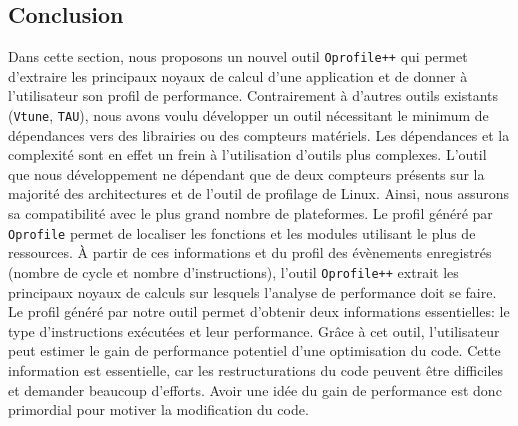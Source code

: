 






\subsection{Conclusion}

    Dans cette section, nous proposons un nouvel outil \verb|Oprofile++| qui permet d'extraire les principaux noyaux de calcul d'une application et de donner à l'utilisateur son profil de performance. Contrairement à d'autres outils existants (\verb=Vtune=, \verb=TAU=), nous avons voulu développer un outil nécessitant le minimum de dépendances vers des librairies ou des compteurs matériels. Les dépendances et la complexité sont en effet un frein à l'utilisation d'outils plus complexes. L'outil que nous développement ne dépendant que de deux compteurs présents sur la majorité des architectures et de l'outil de profilage de Linux. Ainsi, nous assurons sa compatibilité avec le plus grand nombre de plateformes. 
    Le profil généré par \verb|Oprofile| permet de localiser les fonctions et les modules utilisant le plus de ressources. À partir de ces informations et du profil des évènements enregistrés (nombre de cycle et nombre d'instructions), l'outil \verb|Oprofile++| extrait les principaux noyaux de calculs sur lesquels l'analyse de performance doit se faire. Le profil généré par notre outil permet d'obtenir deux informations essentielles: le type d'instructions exécutées et leur performance. Grâce à cet outil, l'utilisateur peut estimer le gain de performance potentiel d'une optimisation du code. Cette information est essentielle, car les restructurations du code peuvent être difficiles et demander beaucoup d'efforts. Avoir une idée du gain de performance est donc primordial pour motiver la modification du code.

